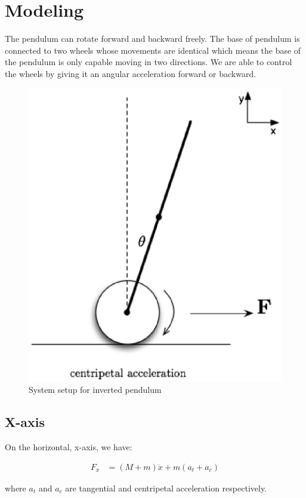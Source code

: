\documentclass{notes}
\begin{document}
\section{Modeling}

The pendulum can rotate forward and backward freely. The base of pendulum is connected to two wheels
whose movements are identical which means the base of the pendulum is only capable moving in two
directions. We are able to control the wheels by giving it an angular acceleration forward or
backward. 

\begin{figure}[!h]
  \begin{center}
    \includegraphics[width=2 in]{pics/Full_System_2.eps}
  \end{center}
  \caption{System setup for inverted pendulum}
  \label{fig:full_system}
\end{figure}

\subsection{X-axis}
On the horizontal, x-axis, we have:

\begin{align*}
  F_x & = (M+m) \ddot{x} + m (a_{t} + a_{c})
\end{align*}

where $a_t$ and $a_c$ are tangential and centripetal acceleration respectively. 
\end{document}
